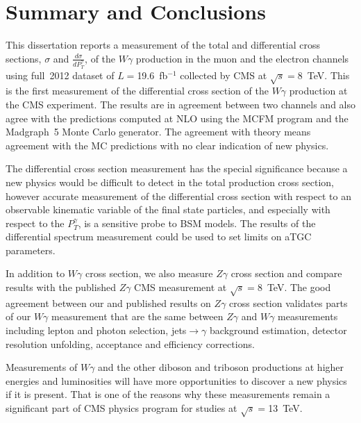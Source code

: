 \chapter{Summary and Conclusions}
\label{sec:Conclusions}

This dissertation reports a measurement of the total and differential cross sections, $\sigma$ and $\frac{d\sigma}{dP_T^{\gamma}}$, of the $W\gamma$ production in the muon and the electron channels using full~2012 dataset of $L=$19.6~fb$^{-1}$ collected by CMS at $\sqrt{s}=$8~TeV. This is the first measurement of the differential cross section of the $W\gamma$ production at the CMS experiment. The results are in agreement between two channels and also agree with the predictions computed at NLO using the MCFM program and the Madgraph~5 Monte Carlo generator. The agreement with theory means agreement with the MC predictions with no clear indication of new physics.

The differential cross section measurement has the special significance because a new physics would be difficult to detect in the total production cross section, however accurate measurement of the differential cross section with respect to an observable kinematic variable of the final state particles, and especially with respect to the $P_T^{\gamma}$, is a sensitive probe to BSM models. The results of the differential spectrum measurement could be used to set limits on aTGC parameters.

In addition to $W\gamma$ cross section, we also measure $Z\gamma$ cross section and compare results with the published $Z\gamma$ CMS measurement at $\sqrt{s}=$8~TeV. The good agreement between our and published results on $Z\gamma$ cross section validates parts of our $W\gamma$ measurement that are the same between $Z\gamma$ and $W\gamma$ measurements including lepton and photon selection, jets$\rightarrow\gamma$ background estimation, detector resolution unfolding, acceptance and efficiency corrections.

Measurements of $W\gamma$ and the other diboson and triboson productions at higher energies and luminosities will have more opportunities to discover a new physics if it is present. That is one of the reasons why these measurements remain a significant part of CMS physics program for studies at $\sqrt{s}=$13~TeV.


